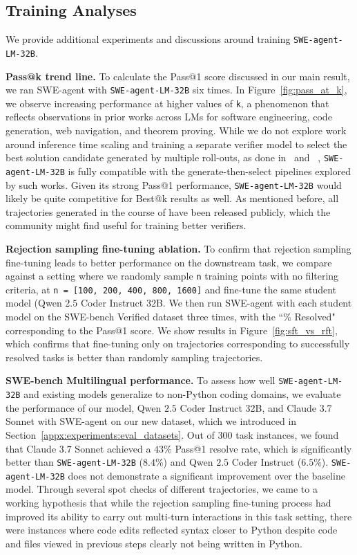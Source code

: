\subsection{Training Analyses}
\label{appx:experiments:training_analyses}
We provide additional experiments and discussions around training \texttt{SWE-agent-LM-32B}.

\textbf{Pass@k trend line.} To calculate the Pass@1 score discussed in our main result, we ran SWE-agent with \texttt{SWE-agent-LM-32B} six times.
In Figure~\ref{fig:pass_at_k}, we observe increasing performance at higher values of \texttt{k}, a phenomenon that reflects observations in prior works across LMs for software engineering, code generation, web navigation, and theorem proving.
While we do not explore work around inference time scaling and training a separate verifier model to select the best solution candidate generated by multiple roll-outs, as done in~\citet{pan_training_2024} and ~\citet{jain2025r2e-gym}, \texttt{SWE-agent-LM-32B} is fully compatible with the generate-then-select pipelines explored by such works.
Given its strong Pass@1 performance, \texttt{SWE-agent-LM-32B} would likely be quite competitive for Best@k results as well.
As mentioned before, all trajectories generated in the course of \bugs{} have been released publicly, which the community might find useful for training better verifiers.

\textbf{Rejection sampling fine-tuning ablation.} To confirm that rejection sampling fine-tuning leads to better performance on the downstream task, we compare against a setting where we randomly sample \texttt{n} training points with no filtering criteria, at \texttt{n = [100, 200, 400, 800, 1600]} and fine-tune the same student model (Qwen $2.5$ Coder Instruct $32$B.
We then run SWE-agent with each student model on the SWE-bench Verified dataset three times, with the ``\% Resolved" corresponding to the Pass@1 score.
We show results in Figure~\ref{fig:sft_vs_rft}, which confirms that fine-tuning only on trajectories corresponding to successfully resolved tasks is better than randomly sampling trajectories.

\textbf{SWE-bench Multilingual performance.} To assess how well \texttt{SWE-agent-LM-32B} and existing models generalize to non-Python coding domains, we evaluate the performance of our model, Qwen $2.5$ Coder Instruct 32B, and Claude $3.7$ Sonnet with SWE-agent on our new dataset, which we introduced in Section~\ref{appx:experiments:eval_datasets}.
Out of $300$ task instances, we found that Claude $3.7$ Sonnet achieved a $43$\% Pass@1 resolve rate, which is significantly better than \texttt{SWE-agent-LM-32B} ($8.4$\%) and Qwen $2.5$ Coder Instruct ($6.5$\%).
\texttt{SWE-agent-LM-32B} does not demonstrate a significant improvement over the baseline model.
Through several spot checks of different trajectories, we came to a working hypothesis that while the rejection sampling fine-tuning process had improved its ability to carry out multi-turn interactions in this task setting, there were instances where code edits reflected syntax closer to Python despite code and files viewed in previous steps clearly not being written in Python.

